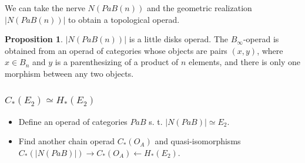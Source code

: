 \documentclass{beamer}
\theoremstyle{definition}
\newtheorem{prop}[teorema]{Proposition}
\begin{document}
\begin{frame}
 We can take the nerve $N(PaB(n))$ and the geometric realization $|N(PaB(n))|$ to obtain a topological operad.\pause
 \begin{prop}
 	$|N(PaB(n))|$ is a little disks operad. The $B_\infty$-operad is obtained from an operad of categories whose objects are pairs $(x,y)$, where $x\in B_n$ and $y$ is a parenthesizing of a product of $n$ elements, and there is only one morphism between any two objects.
 \end{prop}
\end{frame}

\begin{frame} 
\frametitle{$C_*(E_2)\simeq H_*(E_2)$}
	\begin{itemize}
	\item Define an operad of categories $PaB$ s. t. $|N(PaB)|\simeq E_2$. \checkmark
	\item Find another chain operad $C_*(O_A)$ and quasi-isomorphisms $C_*(|N(PaB)|)\to C_*(O_A)\leftarrow H_*(E_2)$. 
\end{itemize}%
\end{frame}
\end{document}
